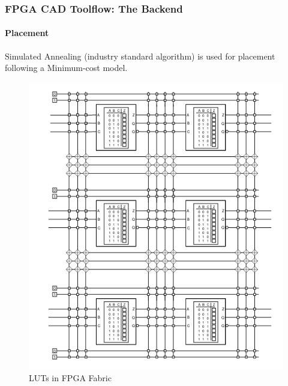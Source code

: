 \documentclass{beamer}
\begin{document}
{\begin{frame}[fragile]
\end{frame}


\begin{frame}[fragile]
  \frametitle{FPGA CAD Toolflow: The Backend}
  \framesubtitle{Placement}
  Simulated Annealing (industry standard algorithm) is used for placement
  following a Minimum-cost model. 
  \begin{figure}
    \centering
    \includegraphics[width=0.35\linewidth]{images/Lut_bare.png}
    \caption{LUTs in FPGA Fabric\cite{brown92}}
    \label{exa-fabric}
  \end{figure}
\end{frame}


}
\end{document}
